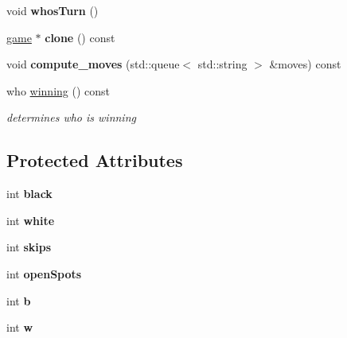 \begin{DoxyCompactItemize}
void {\bfseries whos\+Turn} ()
\item 
\mbox{\label{classmain__savitch__14_1_1_othello_a7a5f8495f1a61f6e7b3968e919013c18}} 
\hyperlink{classmain__savitch__14_1_1game}{game} $\ast$ {\bfseries clone} () const
\item 
\mbox{\label{classmain__savitch__14_1_1_othello_a921d4ffa277b0250f187f20b9598ebb1}} 
void {\bfseries compute\+\_\+moves} (std\+::queue$<$ std\+::string $>$ \&moves) const
\item 
who \hyperlink{classmain__savitch__14_1_1_othello_a4ea78b18eea66c944c0a9356349e0fd4}{winning} () const
\begin{DoxyCompactList}\small\item\em determines who is winning \end{DoxyCompactList}\end{DoxyCompactItemize}
\subsection*{Protected Attributes}
\begin{DoxyCompactItemize}
\item 
\mbox{\label{classmain__savitch__14_1_1_othello_a2eed818925f68d5678b78107a3298138}} 
int {\bfseries black}
\item 
\mbox{\label{classmain__savitch__14_1_1_othello_a7d5f59b1e581ed7a8145debeecf4f310}} 
int {\bfseries white}
\item 
\mbox{\label{classmain__savitch__14_1_1_othello_a85d4ce17512d8dbf85a313a27eea0644}} 
int {\bfseries skips}
\item 
\mbox{\label{classmain__savitch__14_1_1_othello_a15045e3e94c34afe08240885e230d502}} 
int {\bfseries open\+Spots}
\item 
\mbox{\label{classmain__savitch__14_1_1_othello_a98fbc46241d2f5e05ccb4b66f11535bf}} 
int {\bfseries b}
\item 
\mbox{\label{classmain__savitch__14_1_1_othello_a1b11c5fe33e30a94ed39e8cb55caf37e}} 
int {\bfseries w}
\end{DoxyCompactItemize}
